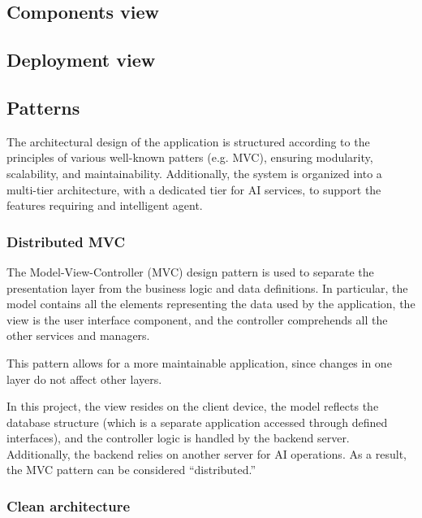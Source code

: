 \documentclass{article}
\begin{document}
\subsection{Components view}


\subsection{Deployment view}


\subsection{Patterns}

The architectural design of the application is structured according to the principles of various well-known patters (e.g. MVC), ensuring modularity, scalability, and maintainability.
Additionally, the system is organized into a multi-tier architecture, with a dedicated tier for AI services, to support the features requiring and intelligent agent.

\subsubsection{Distributed MVC}

The Model-View-Controller (MVC) design pattern is used to separate the presentation layer from the business logic and data definitions.
In particular, the model contains all the elements representing the data used by the application, the view is the user interface component, and the controller comprehends all the other services and managers.

This pattern allows for a  more maintainable application, since changes in one layer do not affect other layers.

In this project, the view resides on the client device, the model reflects the database structure (which is a separate application accessed through defined interfaces), and the controller logic is handled by the backend server.
Additionally, the backend relies on another server for AI operations.
As a result, the MVC pattern can be considered “distributed.”

\subsubsection{Clean architecture}
\end{document}
